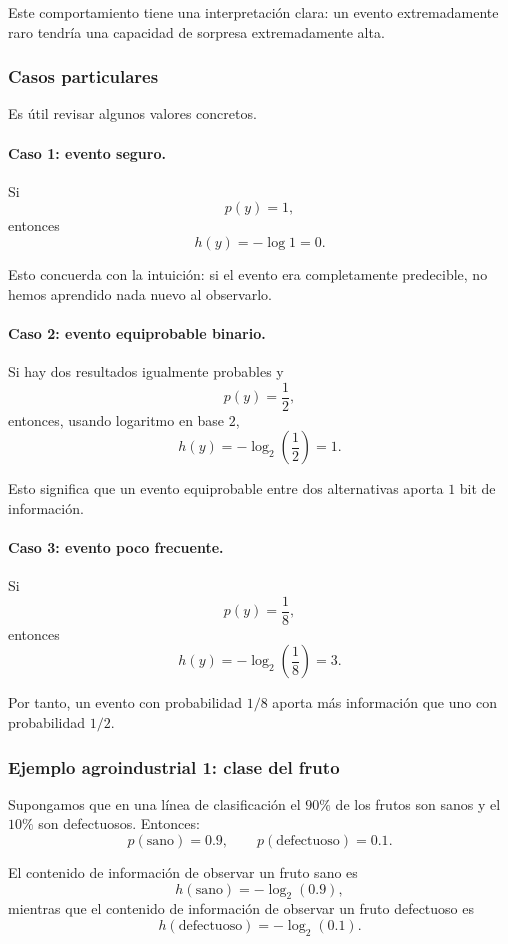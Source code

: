 \documentclass{article}
\begin{document}
Este comportamiento tiene una interpretación clara: un evento extremadamente raro tendría una capacidad de sorpresa extremadamente alta.

\subsubsection*{Casos particulares}

Es útil revisar algunos valores concretos.

\paragraph{Caso 1: evento seguro.}
Si
\[
p(y)=1,
\]
entonces
\[
h(y)=-\log 1 = 0.
\]

Esto concuerda con la intuición: si el evento era completamente predecible, no hemos aprendido nada nuevo al observarlo.

\paragraph{Caso 2: evento equiprobable binario.}
Si hay dos resultados igualmente probables y
\[
p(y)=\frac{1}{2},
\]
entonces, usando logaritmo en base \(2\),
\[
h(y)=-\log_2\left(\frac{1}{2}\right)=1.
\]

Esto significa que un evento equiprobable entre dos alternativas aporta \(1\) bit de información.

\paragraph{Caso 3: evento poco frecuente.}
Si
\[
p(y)=\frac{1}{8},
\]
entonces
\[
h(y)=-\log_2\left(\frac{1}{8}\right)=3.
\]

Por tanto, un evento con probabilidad \(1/8\) aporta más información que uno con probabilidad \(1/2\).

\subsubsection*{Ejemplo agroindustrial 1: clase del fruto}

Supongamos que en una línea de clasificación el \(90\%\) de los frutos son sanos y el \(10\%\) son defectuosos. Entonces:
\[
p(\text{sano})=0.9, \qquad p(\text{defectuoso})=0.1.
\]

El contenido de información de observar un fruto sano es
\[
h(\text{sano})=-\log_2(0.9),
\]
mientras que el contenido de información de observar un fruto defectuoso es
\[
h(\text{defectuoso})=-\log_2(0.1).
\]
\end{document}

